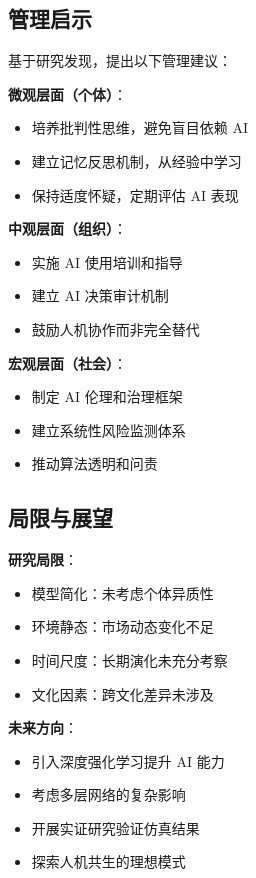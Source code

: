 \documentclass[a4paper,12pt]{article}
\begin{document}
\subsection{管理启示}

基于研究发现，提出以下管理建议：

\textbf{微观层面（个体）}：
\begin{itemize}
    \item 培养批判性思维，避免盲目依赖 AI
    \item 建立记忆反思机制，从经验中学习
    \item 保持适度怀疑，定期评估 AI 表现
\end{itemize}

\textbf{中观层面（组织）}：
\begin{itemize}
    \item 实施 AI 使用培训和指导
    \item 建立 AI 决策审计机制
    \item 鼓励人机协作而非完全替代
\end{itemize}

\textbf{宏观层面（社会）}：
\begin{itemize}
    \item 制定 AI 伦理和治理框架
    \item 建立系统性风险监测体系
    \item 推动算法透明和问责
\end{itemize}

\subsection{局限与展望}

\textbf{研究局限}：
\begin{itemize}
    \item 模型简化：未考虑个体异质性
    \item 环境静态：市场动态变化不足
    \item 时间尺度：长期演化未充分考察
    \item 文化因素：跨文化差异未涉及
\end{itemize}

\textbf{未来方向}：
\begin{itemize}
    \item 引入深度强化学习提升 AI 能力
    \item 考虑多层网络的复杂影响
    \item 开展实证研究验证仿真结果
    \item 探索人机共生的理想模式
\end{itemize}
\end{document}

